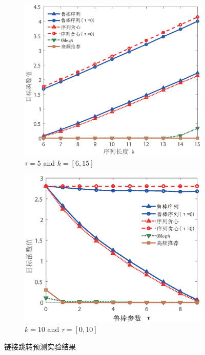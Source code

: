 \begin{figure}[H]
    \medskip

    \begin{subfigure}{0.45\textwidth}
       \includegraphics[width=\linewidth]{figure/rosenets/wik/wik-fun}
        \caption{$\tau=5$ and $k=[6,15]$}
        \label{fig:wik-fun}
    \end{subfigure}
    \hfill
    \begin{subfigure}{0.45\textwidth}
        \includegraphics[width=\linewidth]{figure/rosenets/wik/wik-fun-t}
        \caption{$k=10$ and $\tau=[0,10]$}
        \label{fig:wik-fun-t}
    \end{subfigure}
    \caption{链接跳转预测实验结果\label{fig:wik}}
\end{figure}

